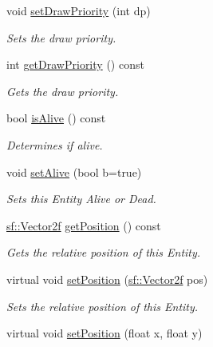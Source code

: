 \begin{DoxyCompactItemize}
\mbox{\label{class_game_entity_a85a4009fa79e292eff6862e4f051e1fc}} 
void \mbox{\hyperlink{class_game_entity_a85a4009fa79e292eff6862e4f051e1fc}{set\+Draw\+Priority}} (int dp)
\begin{DoxyCompactList}\small\item\em Sets the draw priority. \end{DoxyCompactList}\item 
\mbox{\label{class_game_entity_a50cc9e6d17eb432d7e225acf60c5dc3a}} 
int \mbox{\hyperlink{class_game_entity_a50cc9e6d17eb432d7e225acf60c5dc3a}{get\+Draw\+Priority}} () const
\begin{DoxyCompactList}\small\item\em Gets the draw priority. \end{DoxyCompactList}\item 
bool \mbox{\hyperlink{class_game_entity_af07dae87e7d895f3a458c6bba84f76e0}{is\+Alive}} () const
\begin{DoxyCompactList}\small\item\em Determines if alive. \end{DoxyCompactList}\item 
void \mbox{\hyperlink{class_game_entity_a3724480e4515bc3691c87de65de2345e}{set\+Alive}} (bool b=true)
\begin{DoxyCompactList}\small\item\em Sets this Entity Alive or Dead. \end{DoxyCompactList}\item 
\mbox{\hyperlink{classsf_1_1_vector2}{sf\+::\+Vector2f}} \mbox{\hyperlink{class_game_entity_a8456643412ae833a5ce9d1988fa66e72}{get\+Position}} () const
\begin{DoxyCompactList}\small\item\em Gets the relative position of this Entity. \end{DoxyCompactList}\item 
virtual void \mbox{\hyperlink{class_game_entity_ac3187e535e46571a54e1256958ee4a80}{set\+Position}} (\mbox{\hyperlink{classsf_1_1_vector2}{sf\+::\+Vector2f}} pos)
\begin{DoxyCompactList}\small\item\em Sets the relative position of this Entity. \end{DoxyCompactList}\item 
virtual void \mbox{\hyperlink{class_game_entity_a8b4178da06ec2792acfe4480e3e2c8e2}{set\+Position}} (float x, float y)

\end{DoxyCompactItemize}
